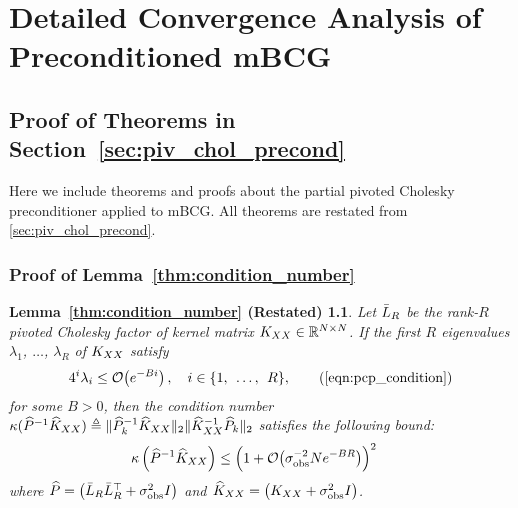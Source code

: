 \chapter{Detailed Convergence Analysis of Preconditioned mBCG}

\section{Proof of Theorems in Section~\ref{sec:piv_chol_precond}}
\label{app:proofs}
Here we include theorems and proofs about the partial pivoted Cholesky preconditioner applied to mBCG.
All theorems are restated from \cref{sec:piv_chol_precond}.


\subsection{Proof of Lemma~\ref{thm:condition_number}}
\newtheorem*{thm:condition_number}{Lemma~\ref{thm:condition_number} (Restated)}
\begin{thm:condition_number}
  Let $\bar{L}_{R}$ be the rank-$R$ pivoted Cholesky factor of kernel matrix $K_{XX} \in \mathbb{R}^{N \times N}$.
  If the first $R$ eigenvalues $\lambda_1$, $\ldots$, $\lambda_R$ of $K_{XX}$ satisfy
	\begin{equation*}
		4^{i}\lambda_{i} \leq \bigo{e^{-Bi}}, \quad i \in \{ 1, \:\: \ldots, \:\: R \},
		\tag{\ref{eqn:pcp_condition}}
	\end{equation*}
	for some $B>0$, then the condition number $\kappa(\widehat{P}^{-1}\widehat{K}_{XX}) \triangleq \Vert \widehat{P}_{k}^{-1}\widehat{K}_{XX} \Vert_{2} \Vert \widehat{K}_{XX}^{-1}\widehat{P}_{k} \Vert_{2}$
	satisfies the following bound:
  \begin{align}
    \kappa \left( \trainP^{-1}\trainK \right)
    &\leq \Bigl( 1 + \bigo{\sigma^{-2}_\text{obs} N e^{-BR}} \Bigr)^2
		\nonumber
  \end{align}
	where $\widehat{P} = \left( \bar{L}_R \bar{L}_R^\top + \sigma^2_\text{obs} I \right)$ and $\widehat{K}_{XX} = \left( K_{XX} + \sigma^2_\text{obs} I \right)$.
\end{thm:condition_number}

